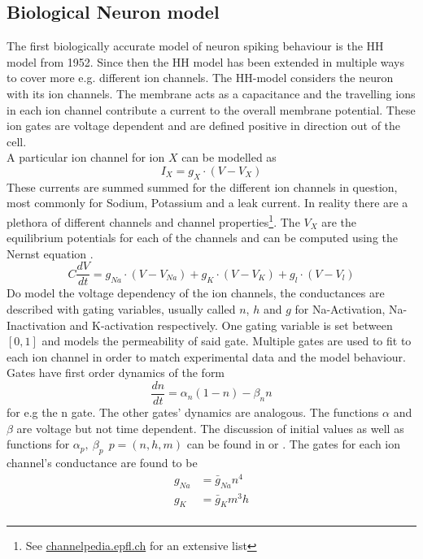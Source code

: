 \subsection{Biological Neuron model}
The first biologically accurate model of neuron spiking behaviour is the \ac{HH} model from 1952\cite{hodgkin_currents_1952}. Since then the \ac{HH} model has been extended in multiple ways to cover more e.g. different ion channels. The \ac{HH}-model considers the neuron with its ion channels. The membrane acts as a capacitance and the travelling ions in each ion channel contribute a current to the overall membrane potential. These ion gates are voltage dependent and are defined positive in direction out of the cell.\\
A particular ion channel for ion $X$ can be modelled as
\begin{equation}
	I_X= g_X \cdot (V-V_X)
\end{equation}
These currents are summed summed for the different ion channels in question, most commonly for Sodium, Potassium and a leak current. In reality there are a plethora of different channels and channel properties\footnote{See  \url{channelpedia.epfl.ch} for an extensive list}. The $V_X$ are the equilibrium potentials for each of the channels and can be computed using the Nernst equation \cite{johnston_foundations_1995}.
\begin{equation}
	C \frac{dV}{dt} = g_{Na} \cdot (V-V_{Na}) + g_K \cdot (V-V_K) + g_l \cdot (V-V_l)
\end{equation}
Do model the voltage dependency of the ion channels, the conductances are described with gating variables, usually called $n$, $h$ and $g$ for Na-Activation, Na-Inactivation and K-activation respectively. One gating variable is set between $[0,1]$ and models the permeability of said gate. Multiple gates are used to fit to each ion channel in order to match experimental data and the model behaviour.\\
Gates have first order dynamics of the form
\begin{equation}
	\frac{dn}{dt} = \alpha_n(1-n) - \beta_n n
\end{equation}
for e.g the n gate. The other gates' dynamics are analogous. The functions $\alpha$ and $\beta$ are voltage but not time dependent. The discussion of initial values as well as functions for $\alpha_p,\ \beta_p\ \ p = (n,h,m)$ can be found in \cite{hodgkin_quantitative_1952} or \cite{johnston_foundations_1995}. The gates for each ion channel's conductance are found to be
\begin{equation}
	\begin{aligned}
	g_{Na} &= \bar{g}_{Na} n^4\\
	g_{K} &= \bar{g}_{K} m^3h\\
	\end{aligned}
\end{equation}
